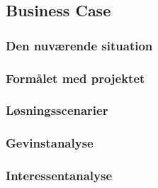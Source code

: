 \subsection{Business Case}

\subsubsection{Den nuværende situation}

\subsubsection{Formålet med projektet}

\subsubsection{Løsningsscenarier}

\subsubsection{Gevinstanalyse}

\subsubsection{Interessentanalyse}